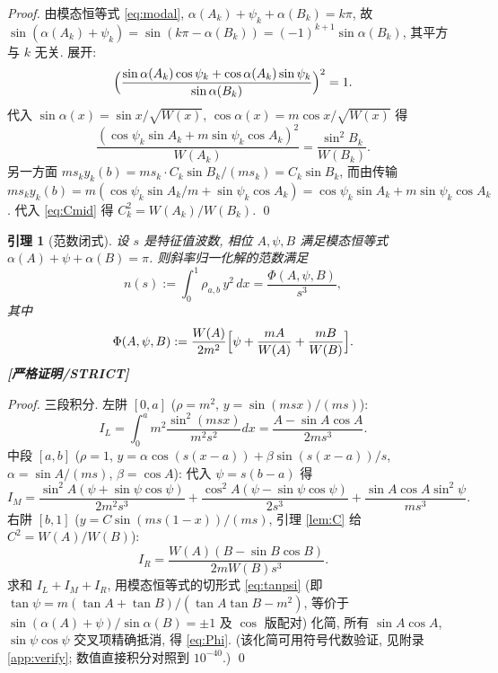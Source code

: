 \documentclass[UTF8]{ctexart}
\newtheorem{lemma}[theorem]{引理}
\newcommand{\STRICT}{\textbf{[严格证明/STRICT]}}
\begin{document}
\begin{proof}
	由模态恒等式 \eqref{eq:modal}, $\alpha(A_k)+\psi_k+\alpha(B_k)=k\pi$, 故
	$\sin(\alpha(A_k)+\psi_k)=\sin(k\pi-\alpha(B_k))=(-1)^{k+1}\sin\alpha(B_k)$,
	其平方与 $k$ 无关. 展开:
	\begin{equation}
		\Bigl(\frac{\sin\alpha(A_k)\cos\psi_k+\cos\alpha(A_k)\sin\psi_k}{\sin\alpha(B_k)}\Bigr)^2=1.
	\end{equation}
	代入 $\sin\alpha(x)=\sin x/\sqrt{W(x)}$, $\cos\alpha(x)=m\cos x/\sqrt{W(x)}$ 得
	\begin{equation}
		\frac{(\cos\psi_k\sin A_k+m\sin\psi_k\cos A_k)^2}{W(A_k)}
		=\frac{\sin^2B_k}{W(B_k)}.
		\label{eq:Cmid}
	\end{equation}
	另一方面 $ms_ky_k(b)=ms_k\cdot C_k\sin B_k/(ms_k)=C_k\sin B_k$, 而由传输
	$ms_ky_k(b)=m(\cos\psi_k\sin A_k/m+\sin\psi_k\cos A_k)
	=\cos\psi_k\sin A_k+m\sin\psi_k\cos A_k$. 代入 \eqref{eq:Cmid} 得
	$C_k^2=W(A_k)/W(B_k)$. \qed
\end{proof}

\begin{lemma}[范数闭式]\label{lem:norm}
	设 $s$ 是特征值波数, 相位 $A,\psi,B$ 满足模态恒等式 $\alpha(A)+\psi+\alpha(B)=\pi$.
	则斜率归一化解的范数满足
	\begin{equation}
		n(s):=\int_0^1\rho_{a,b}\,y^2\,dx=\frac{\Phi(A,\psi,B)}{s^3},
		\label{eq:norm}
	\end{equation}
	其中
	\begin{equation}
		\Phi(A,\psi,B):=\frac{W(A)}{2m^2}
		\Bigl[\psi+\frac{mA}{W(A)}+\frac{mB}{W(B)}\Bigr].
		\label{eq:Phi}
	\end{equation}
	\STRICT{}
\end{lemma}

\begin{proof}
	三段积分. 左阱 $[0,a]$ ($\rho=m^2$, $y=\sin(msx)/(ms)$):
	\begin{equation}
		I_L=\int_0^a m^2\frac{\sin^2(msx)}{m^2s^2}dx
		=\frac{A-\sin A\cos A}{2ms^3}.
	\end{equation}
	中段 $[a,b]$ ($\rho=1$, $y=\alpha\cos(s(x-a))+\beta\sin(s(x-a))/s$,
	$\alpha=\sin A/(ms)$, $\beta=\cos A$): 代入 $\psi=s(b-a)$ 得
	\begin{equation}
		I_M=\frac{\sin^2A(\psi+\sin\psi\cos\psi)}{2m^2s^3}
		+\frac{\cos^2A(\psi-\sin\psi\cos\psi)}{2s^3}
		+\frac{\sin A\cos A\sin^2\psi}{ms^3}.
	\end{equation}
	右阱 $[b,1]$ ($y=C\sin(ms(1-x))/(ms)$, 引理 \ref{lem:C} 给
	$C^2=W(A)/W(B)$):
	\begin{equation}
		I_R=\frac{W(A)(B-\sin B\cos B)}{2mW(B)s^3}.
	\end{equation}
	求和 $I_L+I_M+I_R$, 用模态恒等式的切形式
	\eqref{eq:tanpsi} (即 $\tan\psi=m(\tan A+\tan B)/(\tan A\tan B-m^2)$, 等价于
	$\sin(\alpha(A)+\psi)/\sin\alpha(B)=\pm1$ 及 $\cos$ 版配对) 化简, 所有
	$\sin A\cos A$, $\sin\psi\cos\psi$ 交叉项精确抵消, 得 \eqref{eq:Phi}.
	(该化简可用符号代数验证, 见附录 \ref{app:verify}; 数值直接积分对照到
	$10^{-40}$.) \qed
\end{proof}
\end{document}

